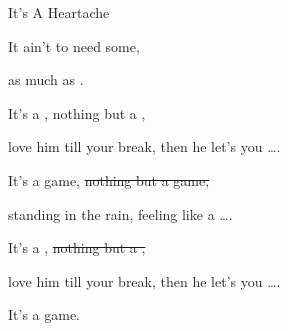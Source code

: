 \begin{SBSong}{It's A Heartache}
\begin{SBVerse}
    It ain't  to need some, 

    as much as   \quad {}.
  \end{SBVerse}
  \CBPageBrk
  \begin{SBVerse}
    It's a , nothing but a ,

    love him till your  break, then he let's you \ldots{}.

    It's a  game, \sout{nothing but a  game,}

    standing in the  rain, feeling like a \ldots{}.
    
    It's a , \sout{nothing but a ,}

    love him till your  break, then he let's you \ldots{}.
    
    It's a  game.
  \end{SBVerse}
\end{SBSong}
